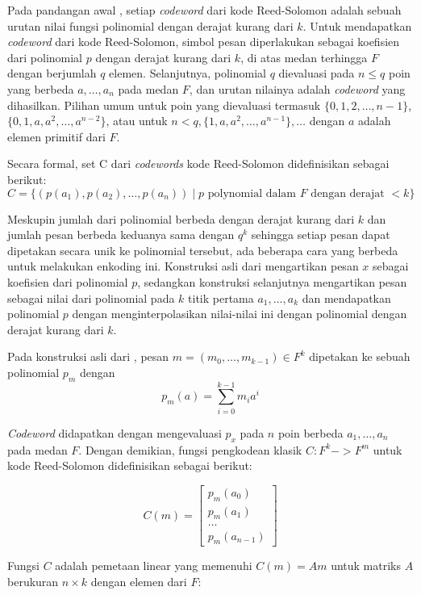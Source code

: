 Pada pandangan awal \textcite{reed1960polynomial}, setiap \textit{codeword} dari kode Reed-Solomon adalah sebuah urutan nilai fungsi polinomial dengan derajat kurang dari $k$. Untuk mendapatkan \textit{codeword} dari kode Reed-Solomon, simbol pesan diperlakukan sebagai koefisien dari polinomial $p$ dengan derajat kurang dari $k$, di atas medan terhingga $F$ dengan berjumlah $q$ elemen. Selanjutnya, polinomial $q$ dievaluasi pada $n \le q$ poin yang berbeda $a, \ldots, a_n$ pada medan $F$, dan urutan nilainya adalah \textit{codeword} yang dihasilkan. Pilihan umum untuk poin yang dievaluasi termasuk $\{0, 1, 2, \ldots, n-1\}$, $\{0, 1, a, a^2, \ldots, a^{n-2}\}$, atau untuk $n < q, \{1, a, a^2, \ldots, a^{n-1}\}, \ldots$ dengan $a$ adalah elemen primitif dari $F$.

Secara formal, set C dari \textit{codewords} kode Reed-Solomon didefinisikan sebagai berikut: \[C = \{(p(a_1),p(a_2),\ldots,p(a_n)) \mid p \text{ polynomial dalam } F \text{ dengan derajat } < k\}\]

Meskupin jumlah dari polinomial berbeda dengan derajat kurang dari $k$ dan jumlah pesan berbeda keduanya sama dengan $q^k$ sehingga setiap pesan dapat dipetakan secara unik ke polinomial tersebut, ada beberapa cara yang berbeda untuk melakukan enkoding ini. Konstruksi asli dari \textcite{reed1960polynomial} mengartikan pesan $x$ sebagai koefisien dari polinomial $p$, sedangkan konstruksi selanjutnya mengartikan pesan sebagai nilai dari polinomial pada $k$ titik pertama $a_1,\ldots,a_k$ dan mendapatkan polinomial $p$ dengan menginterpolasikan nilai-nilai ini dengan polinomial dengan derajat kurang dari $k$.

Pada konstruksi asli dari \textcite{reed1960polynomial}, pesan $m = (m_0, \ldots , m_{k-1}) \in F^k$ dipetakan ke sebuah polinomial $p_m$ dengan \[p_m(a) = \sum_{i=0}^{k-1}{m_i}{a^i}\]

\textit{Codeword} didapatkan dengan mengevaluasi $p_x$ pada $n$ poin berbeda $a_1, \ldots, a_n$ pada medan $F$. Dengan demikian, fungsi pengkodean klasik $C : {F^k} -> {F^m}$ untuk kode Reed-Solomon didefinisikan sebagai berikut:

\[
    C(m) = \begin{bmatrix}
        p_m(a_0)\\
        p_m(a_1)\\
        \ldots\\
        p_m(a_{n-1})
    \end{bmatrix}  
\]

Fungsi $C$ adalah pemetaan linear yang memenuhi $C(m) = Am$ untuk matriks $A$ berukuran ${n} \times {k}$ dengan elemen dari $F$:

